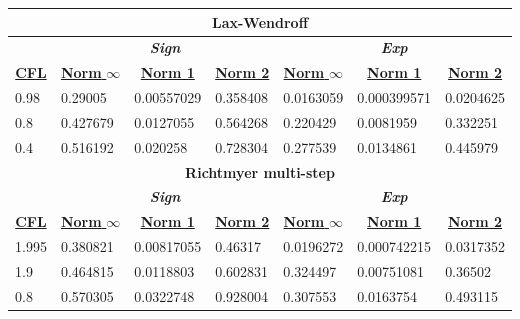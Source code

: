 \begin{table}[]
\begin{tabular}{|l|l|l|l|l|l|l|}
					\multicolumn{7}{|c|}{\textbf{Lax-Wendroff}} \\ \hline
					& \multicolumn{3}{|c|}{\textit{\textbf{Sign}}} & \multicolumn{3}{|c|}{\textit{\textbf{Exp}}} \\ \hline
					\multicolumn{1}{|c|}{{\ul \textbf{CFL}}} & \multicolumn{1}{|c|}{{\ul \textbf{Norm }$\infty$}} & \multicolumn{1}{|c|}{{\ul \textbf{Norm 1}}} & \multicolumn{1}{|c|}{{\ul \textbf{Norm 2}}} & \multicolumn{1}{|c|}{{\ul \textbf{Norm }$\infty$}} & \multicolumn{1}{|c|}{{\ul \textbf{Norm 1}}} & \multicolumn{1}{|c|}{{\ul \textbf{Norm 2}}} \\ \hline \hline
					0.98 & 0.29005 & 0.00557029 & 0.358408 & 0.0163059 & 0.000399571 & 0.0204625 \\ \hline
					0.8 & 0.427679 & 0.0127055 & 0.564268 & 0.220429 & 0.0081959 & 0.332251 \\ \hline
					0.4 & 0.516192 & 0.020258 & 0.728304 & 0.277539 & 0.0134861 & 0.445979 \\ \hline \hline
											
					\multicolumn{7}{|c|}{\textbf{Richtmyer multi-step}} \\ \hline
					& \multicolumn{3}{|c|}{\textit{\textbf{Sign}}} & \multicolumn{3}{|c|}{\textit{\textbf{Exp}}} \\ \hline
					\multicolumn{1}{|c|}{{\ul \textbf{CFL}}} & \multicolumn{1}{|c|}{{\ul \textbf{Norm }$\infty$}} & \multicolumn{1}{|c|}{{\ul \textbf{Norm 1}}} & \multicolumn{1}{|c|}{{\ul \textbf{Norm 2}}} & \multicolumn{1}{|c|}{{\ul \textbf{Norm }$\infty$}} & \multicolumn{1}{|c|}{{\ul \textbf{Norm 1}}} & \multicolumn{1}{|c|}{{\ul \textbf{Norm 2}}} \\ \hline \hline
					1.995 & 0.380821 & 0.00817055 & 0.46317 & 0.0196272 & 0.000742215 & 0.0317352 \\ \hline
					1.9 & 0.464815 & 0.0118803 & 0.602831 & 0.324497 & 0.00751081 & 0.36502 \\ \hline
					0.8 & 0.570305 & 0.0322748 & 0.928004 & 0.307553 & 0.0163754 & 0.493115 \\ \hline \hline
				\end{tabular}
			\end{table}